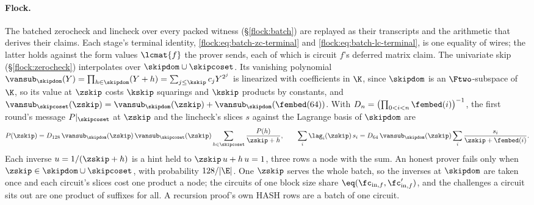 \paragraph{Flock.} The batched zerocheck and lincheck over every packed witness (\S\ref{flock:batch}) are replayed as their transcripts and the arithmetic that derives their claims. Each stage's terminal identity, \eqref{flock:eq:batch-zc-terminal} and \eqref{flock:eq:batch-lc-terminal}, is one equality of wires; the latter holds against the form values $\lcmat{f}$ the prover sends, each of which is circuit $f$'s deferred matrix claim. The univariate skip (\S\ref{flock:zerocheck}) interpolates over $\skipdom\cup\skipcoset$. Its vanishing polynomial $\vansub_{\skipdom}(Y)=\prod_{h\in\skipdom}(Y+h)=\sum_{j\le\kskip}c_jY^{2^j}$ is linearized with coefficients in $\K$, since $\skipdom$ is an $\Ftwo$-subspace of $\K$, so its value at $\zskip$ costs $\kskip$ squarings and $\kskip$ products by constants, and $\vansub_{\skipcoset}(\zskip)=\vansub_{\skipdom}(\zskip)+\vansub_{\skipdom}(\fembed(64))$. With $D_n=\bigl(\prod_{0<i<n}\fembed(i)\bigr)^{-1}$, the first round's message $P|_{\skipcoset}$ at $\zskip$ and the lincheck's slices $s$ against the Lagrange basis of $\skipdom$ are
\[
  P(\zskip)=D_{128}\,\vansub_{\skipdom}(\zskip)\,\vansub_{\skipcoset}(\zskip)\sum_{h\in\skipcoset}\frac{P(h)}{\zskip+h},\qquad
  \sum_i\lag_i(\zskip)\,s_i=D_{64}\,\vansub_{\skipdom}(\zskip)\sum_{i}\frac{s_i}{\zskip+\fembed(i)}.
\]
Each inverse $u=1/(\zskip+h)$ is a hint held to $\zskip\,u+h\,u=1$, three rows a node with the sum. An honest prover fails only when $\zskip\in\skipdom\cup\skipcoset$, with probability $128/|\E|$. One $\zskip$ serves the whole batch, so the inverses at $\skipdom$ are taken once and each circuit's slices cost one product a node; the circuits of one block size share $\eq(\fc_{\mathrm{in},f},\fc'_{\mathrm{in},f})$, and the challenges a circuit sits out are one product of suffixes for all. A recursion proof's own \textsf{HASH} rows are a batch of one circuit.

